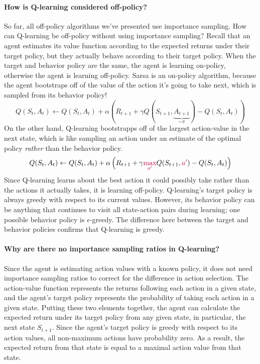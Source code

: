 \documentclass[12pt]{article}
\begin{document}
\paragraph{How is Q-learning considered off-policy?}
So far, all off-policy algorithms we've presented use importance sampling. How can Q-learning be off-policy without using importance sampling? Recall that an agent estimates its value function according to the expected returns under their target policy, but they actually behave according to their target policy. When the target and behavior policy are the same, the agent is learning on-policy, otherwise the agent is learning off-policy. Sarsa is an on-policy algorithm, because the agent bootstraps off of the value of the action it's going to take next, which is sampled from its behavior policy!
\[
Q(S_t, A_t) \gets Q(S_t, A_t) + \alpha   \left(R_{t+1} + \gamma Q(S_{t+1}, \underbrace{A_{t+1}}_{\sim \pi}) - Q(S_t, A_t)\right)  
\]
On the other hand, Q-learning bootstrapps off of the largest action-value in the next state, which is like sampling an action under an estimate of the optimal policy \emph{rather} than the behavior policy.
\[
Q(S_t, A_t) \gets Q(S_t, A_t) + \alpha   \left(R_{t+1} + \gamma {\color{purple} \max_{a'}} Q(S_{t+1}, {\color{purple}a'}) - Q(S_t, A_t)\right)
\]
Since Q-learning learns about the best action it could possibly take rather than the actions it actually takes, it is learning off-policy. Q-learning's target policy is always greedy with respect to its current values. However, its behavior policy can be anything that continues to visit all state-action pairs during learning; one possible behavior policy is $\epsilon$-greedy. The difference here between the target and behavior policies confirms that Q-learning is greedy.

\paragraph{Why are there no importance sampling ratios in Q-learning?}
Since the agent is estimating action values with a known policy, it does not need importance sampling ratios to correct for the difference in action selection. The action-value function represents the returns following each action in a given state, and the agent's target policy represents the probability of taking each action in a given state. Putting these two elements together, the agent can calculate the expected return under its target policy from any given state, in particular, the next state $S_{t+1}$. Since the agent's target policy is greedy with respect to its action values, all non-maximum actions have probability zero. As a result, the expected return from that state is equal to a maximal action value from that state. 
\end{document}
